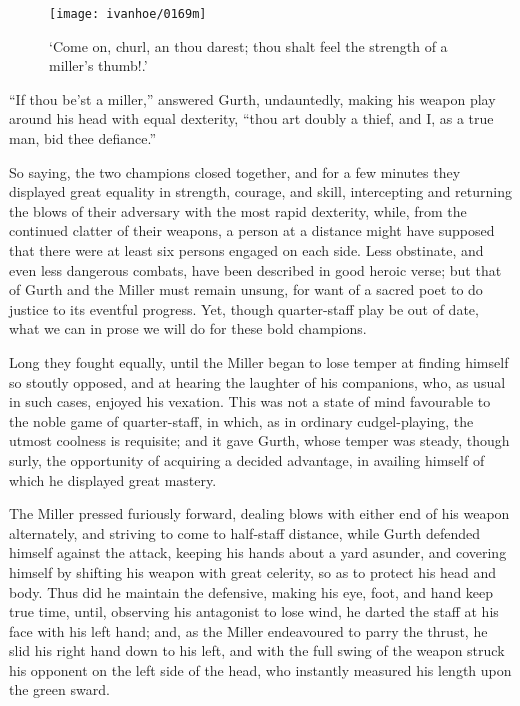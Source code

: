 \begin{figure}
    \centering
    \texttt{[image: ivanhoe/0169m]}
    \caption{`Come on, churl, an thou darest; thou shalt feel the
    strength of a miller's thumb!.'}
\end{figure}

``If thou be'st a miller,'' answered Gurth, undauntedly, making his
weapon play around his head with equal dexterity, ``thou art doubly a
thief, and I, as a true man, bid thee defiance.''

So saying, the two champions closed together, and for a few minutes they
displayed great equality in strength, courage, and skill, intercepting
and returning the blows of their adversary with the most rapid
dexterity, while, from the continued clatter of their weapons, a person
at a distance might have supposed that there were at least six persons
engaged on each side. Less obstinate, and even less dangerous combats,
have been described in good heroic verse; but that of Gurth and the
Miller must remain unsung, for want of a sacred poet to do justice to
its eventful progress. Yet, though quarter-staff play be out of date,
what we can in prose we will do for these bold champions.

Long they fought equally, until the Miller began to lose temper at
finding himself so stoutly opposed, and at hearing the laughter of his
companions, who, as usual in such cases, enjoyed his vexation. This was
not a state of mind favourable to the noble game of quarter-staff, in
which, as in ordinary cudgel-playing, the utmost coolness is requisite;
and it gave Gurth, whose temper was steady, though surly, the
opportunity of acquiring a decided advantage, in availing himself of
which he displayed great mastery.

The Miller pressed furiously forward, dealing blows with either end of
his weapon alternately, and striving to come to half-staff distance,
while Gurth defended himself against the attack, keeping his hands about
a yard asunder, and covering himself by shifting his weapon with great
celerity, so as to protect his head and body. Thus did he maintain the
defensive, making his eye, foot, and hand keep true time, until,
observing his antagonist to lose wind, he darted the staff at his face
with his left hand; and, as the Miller endeavoured to parry the thrust,
he slid his right hand down to his left, and with the full swing of the
weapon struck his opponent on the left side of the head, who instantly
measured his length upon the green sward.

